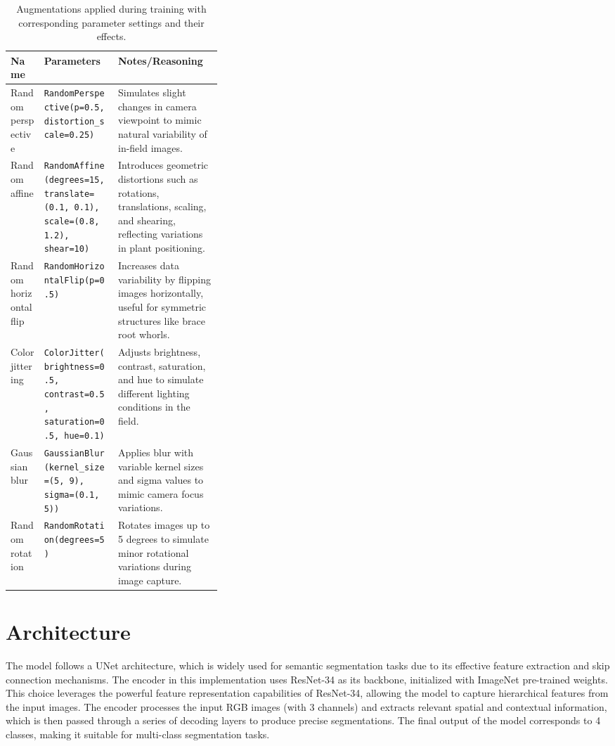 \begin{table}[ht]
\begin{tabularx}{\linewidth}{>{\raggedright\arraybackslash}X p{0.35\linewidth} >{\raggedright\arraybackslash}X}

\toprule
\textbf{Name} & \textbf{Parameters} & \textbf{Notes/Reasoning} \\
\midrule
Random perspective & \texttt{RandomPerspective(p=0.5, distortion\_scale=0.25)} & Simulates slight changes in camera viewpoint to mimic natural variability of in-field images. \\
Random affine      & \texttt{RandomAffine(degrees=15, translate=(0.1, 0.1), scale=(0.8, 1.2), shear=10)} & Introduces geometric distortions such as rotations, translations, scaling, and shearing, reflecting variations in plant positioning. \\
Random horizontal flip & \texttt{RandomHorizontalFlip(p=0.5)} & Increases data variability by flipping images horizontally, useful for symmetric structures like brace root whorls. \\
Color jittering    & \texttt{ColorJitter(brightness=0.5, contrast=0.5, saturation=0.5, hue=0.1)} & Adjusts brightness, contrast, saturation, and hue to simulate different lighting conditions in the field. \\
Gaussian blur    & \texttt{GaussianBlur(kernel\_size=(5, 9), sigma=(0.1, 5))} & Applies blur with variable kernel sizes and sigma values to mimic camera focus variations. \\
Random rotation  & \texttt{RandomRotation(degrees=5)} & Rotates images up to 5 degrees to simulate minor rotational variations during image capture. \\
\bottomrule
\end{tabularx}
\caption{Augmentations applied during training with corresponding parameter settings and their effects.}
\label{tab:augmentations_notes}
\end{table}


\section{Architecture}
The model follows a UNet architecture, which is widely used for semantic segmentation tasks due to its effective feature extraction and skip connection mechanisms. The encoder in this implementation uses ResNet-34 as its backbone, initialized with ImageNet pre-trained weights. This choice leverages the powerful feature representation capabilities of ResNet-34, allowing the model to capture hierarchical features from the input images. The encoder processes the input RGB images (with 3 channels) and extracts relevant spatial and contextual information, which is then passed through a series of decoding layers to produce precise segmentations. The final output of the model corresponds to 4 classes, making it suitable for multi-class segmentation tasks. 

